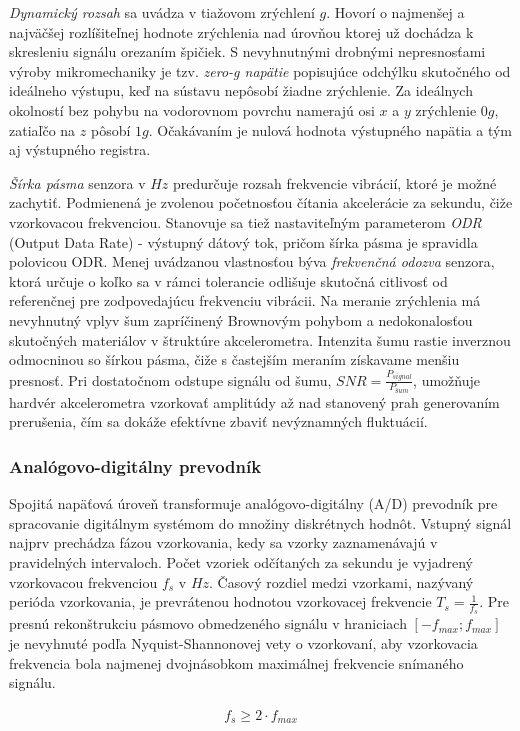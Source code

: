 \emph{Dynamický rozsah} sa uvádza v tiažovom  zrýchlení $g$. Hovorí o najmenšej a najväčšej rozlíšiteľnej hodnote zrýchlenia nad 
úrovňou ktorej už dochádza k skresleniu signálu orezaním špičiek. S nevyhnutnými drobnými nepresnosťami výroby mikromechaniky je tzv. 
\emph{zero-g napätie} popisujúce odchýlku skutočného od ideálneho výstupu, keď na sústavu nepôsobí žiadne zrýchlenie. Za ideálnych 
okolností bez pohybu na vodorovnom povrchu namerajú osi $x$ a $y$ zrýchlenie $0g$, zatiaľčo na $z$ pôsobí $1g$. Očakávaním je nulová 
hodnota výstupného napätia a tým aj výstupného registra.

\emph{Šírka pásma} senzora v $Hz$ predurčuje rozsah frekvencie vibrácií, ktoré je možné zachytiť. Podmienená je zvolenou početnosťou 
čítania akcelerácie za sekundu, čiže vzorkovacou frekvenciou. Stanovuje sa tiež nastaviteľným parameterom \emph{ODR} (Output Data Rate) 
- výstupný dátový tok, pričom šírka pásma je spravidla polovicou ODR. Menej uvádzanou vlastnosťou býva \emph{frekvenčná odozva} 
senzora, ktorá určuje o koľko sa v rámci tolerancie odlišuje skutočná citlivosť od referenčnej pre zodpovedajúcu frekvenciu vibrácii.
Na meranie zrýchlenia má nevyhnutný vplyv šum zapríčinený Brownovým pohybom a nedokonalosťou skutočných materiálov v štruktúre
akcelerometra. Intenzita šumu rastie inverznou odmocninou so šírkou pásma, čiže s častejším meraním získavame menšiu presnosť. Pri dostatočnom odstupe signálu od šumu, $SNR = \frac{P_{signal}}{P_{šum}}$, umožňuje hardvér akcelerometra vzorkovať amplitúdy až
nad stanovený prah generovaním prerušenia, čím sa dokáže efektívne zbaviť nevýznamných fluktuácií.

\subsubsection{Analógovo-digitálny prevodník}
Spojitá napäťová úroveň transformuje analógovo-digitálny (A/D) prevodník pre spracovanie digitálnym systémom do množiny diskrétnych 
hodnôt. Vstupný signál najprv prechádza fázou vzorkovania, kedy sa vzorky zaznamenávajú v pravidelných intervaloch. Počet vzoriek 
odčítaných za sekundu je vyjadrený vzorkovacou frekvenciou $f_s$ v $Hz$. Časový rozdiel medzi vzorkami, nazývaný perióda vzorkovania, 
je prevrátenou hodnotou vzorkovacej frekvencie $T_s = \frac{1}{f_s}$. Pre presnú rekonštrukciu pásmovo obmedzeného signálu v hraniciach 
$[-f_{max}; f_{max}]$ je nevyhnuté podľa Nyquist-Shannonovej vety o vzorkovaní, aby vzorkovacia frekvencia bola najmenej dvojnásobkom 
maximálnej frekvencie snímaného signálu.
\begin{ceqn}\begin{align}
   f_s \geq 2 \cdot f_{max} 
\end{align}\end{ceqn} 

